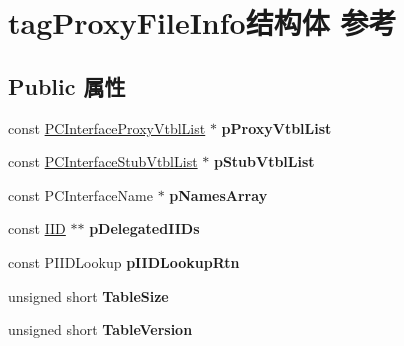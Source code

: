 \hypertarget{structtag_proxy_file_info}{}\section{tag\+Proxy\+File\+Info结构体 参考}
\label{structtag_proxy_file_info}
\subsection*{Public 属性}
\begin{DoxyCompactItemize}
\item 
\mbox{\label{structtag_proxy_file_info_abd27d2399e69721f31be570ab73562d4}} 
const \hyperlink{structtag_c_interface_proxy_vtbl}{P\+C\+Interface\+Proxy\+Vtbl\+List} $\ast$ {\bfseries p\+Proxy\+Vtbl\+List}
\item 
\mbox{\label{structtag_proxy_file_info_a4d36f4cc66f305758f7be28bb53ad922}} 
const \hyperlink{structtag_c_interface_stub_vtbl}{P\+C\+Interface\+Stub\+Vtbl\+List} $\ast$ {\bfseries p\+Stub\+Vtbl\+List}
\item 
\mbox{\label{structtag_proxy_file_info_ad6f4fff93641028a3253655c65806abe}} 
const P\+C\+Interface\+Name $\ast$ {\bfseries p\+Names\+Array}
\item 
\mbox{\label{structtag_proxy_file_info_a4af094845edb6dcfe4b5e60785e61174}} 
const \hyperlink{struct___i_i_d}{I\+ID} $\ast$$\ast$ {\bfseries p\+Delegated\+I\+I\+Ds}
\item 
\mbox{\label{structtag_proxy_file_info_a8a6710561e7a70774c3a368a8548fd41}} 
const P\+I\+I\+D\+Lookup {\bfseries p\+I\+I\+D\+Lookup\+Rtn}
\item 
\mbox{\label{structtag_proxy_file_info_a399abab0ba4d09e4451dd47b0bc871d0}} 
unsigned short {\bfseries Table\+Size}
\item 
\mbox{\label{structtag_proxy_file_info_a2860d97e7bbb696442efa91265b4f927}} 
unsigned short {\bfseries Table\+Version}
\item 
\mbox{\label{structtag_proxy_file_info_a7b85de74774177ba302a2503e5b2840a}} 
$$
\end{DoxyCompactItemize}
